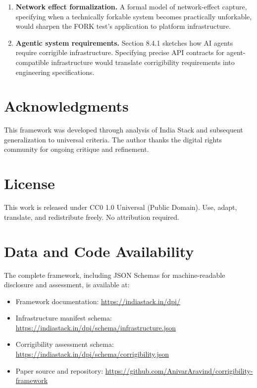 \documentclass{article}
\begin{document}
\begin{enumerate}
    \item \textbf{Network effect formalization.} A formal model of network-effect capture, specifying when a technically forkable system becomes practically unforkable, would sharpen the FORK test's application to platform infrastructure.

    \item \textbf{Agentic system requirements.} Section 8.4.1 sketches how AI agents require corrigible infrastructure. Specifying precise API contracts for agent-compatible infrastructure would translate corrigibility requirements into engineering specifications.
\end{enumerate}

\section*{Acknowledgments}

This framework was developed through analysis of India Stack and subsequent generalization to universal criteria. The author thanks the digital rights community for ongoing critique and refinement.

\section*{License}

This work is released under CC0 1.0 Universal (Public Domain). Use, adapt, translate, and redistribute freely. No attribution required.

\section*{Data and Code Availability}

The complete framework, including JSON Schemas for machine-readable disclosure and assessment, is available at:

\begin{itemize}
    \item Framework documentation: \url{https://indiastack.in/dpi/}
    \item Infrastructure manifest schema: \url{https://indiastack.in/dpi/schema/infrastructure.json}
    \item Corrigibility assessment schema: \url{https://indiastack.in/dpi/schema/corrigibility.json}
    \item Paper source and repository: \url{https://github.com/AnivarAravind/corrigibility-framework}
\end{itemize}
\end{document}
